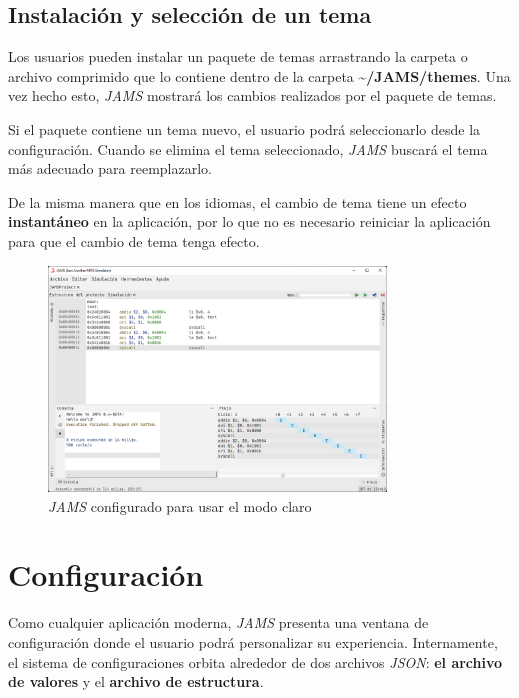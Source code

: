 \subsection{Instalación y selección de un tema}\label{subsec:instalacion-y-seleccion-de-un-tema}

Los usuarios pueden instalar un paquete de temas arrastrando la carpeta o
archivo comprimido que lo contiene dentro de la carpeta \textbf{\textasciitilde/JAMS/themes}.
Una vez hecho esto, \textit{JAMS} mostrará los cambios realizados por el paquete de temas.

Si el paquete contiene un tema nuevo, el usuario podrá seleccionarlo desde la configuración.
Cuando se elimina el tema seleccionado, \textit{JAMS}
buscará el tema más adecuado para reemplazarlo.

De la misma manera que en los idiomas, el cambio de tema tiene un
efecto \textbf{instantáneo} en la aplicación, por lo que no es necesario
reiniciar la aplicación para que el cambio de tema tenga efecto.

\begin{figure}[H]
    \centering
    \includegraphics[width=0.8\textwidth]{images/base/jams-theme}
    \caption{\textit{JAMS} configurado para usar el modo claro}
    \label{fig:jams-light-theme}
\end{figure}


\section{Configuración}\label{sec:configuracion}

Como cualquier aplicación moderna, \textit{JAMS} presenta una
ventana de configuración donde el usuario podrá personalizar su experiencia.
Internamente, el sistema de configuraciones orbita
alrededor de dos archivos \textit{JSON}\cite{JSON}:
\textbf{el archivo de valores} y el \textbf{archivo de estructura}.

